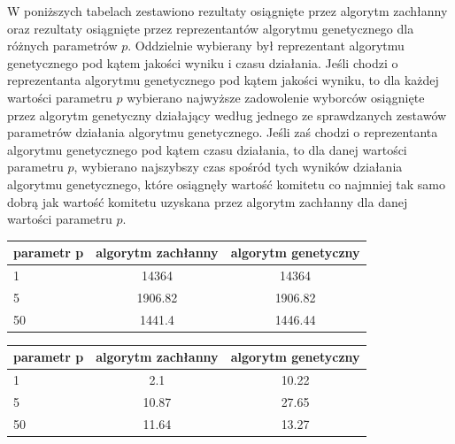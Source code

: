 \documentclass[pdflatex,11pt]{../aghdoc_version2}
\begin{document}
\newpage
W poniższych tabelach zestawiono rezultaty osiągnięte przez algorytm zachłanny oraz rezultaty osiągnięte przez reprezentantów algorytmu genetycznego dla różnych parametrów $p$. Oddzielnie wybierany był reprezentant algorytmu genetycznego pod kątem jakości wyniku i czasu działania. Jeśli chodzi o reprezentanta algorytmu genetycznego pod kątem jakości wyniku, to dla każdej wartości parametru $p$ wybierano najwyższe zadowolenie wyborców osiągnięte przez algorytm genetyczny działający według jednego ze sprawdzanych zestawów parametrów działania algorytmu genetycznego. Jeśli zaś chodzi o reprezentanta algorytmu genetycznego pod kątem czasu działania, to dla danej wartości parametru $p$, wybierano najszybszy czas spośród tych wyników działania algorytmu genetycznego, które osiągnęły wartość komitetu co najmniej tak samo dobrą jak wartość komitetu uzyskana przez algorytm zachłanny dla danej wartości parametru $p$. \\

\begin{center}

\begin{tabular}{|l|c|c|}
\hline 
parametr p & algorytm zachłanny & algorytm genetyczny \\ 
\hline 
1 & 14364 & 14364 \\ 
\hline 
5 & 1906.82 & 1906.82 \\ 
\hline 
50 & 1441.4 & 1446.44 \\ 
\hline 
\end{tabular} 
\end{center}

\begin{center}
\begin{tabular}{|l|c|c|}
\hline 
parametr p & algorytm zachłanny & algorytm genetyczny \\ 
\hline 
1 & 2.1 & 10.22 \\ 
\hline 
5 & 10.87 & 27.65 \\ 
\hline 
50 & 11.64 & 13.27 \\ 
\hline 
\end{tabular} 
\end{center}
\end{document}
